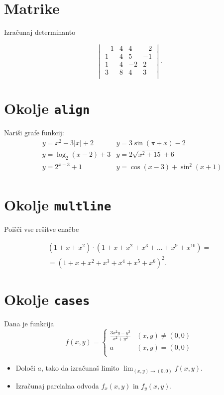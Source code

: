 \documentclass[a4paper,12pt]{article}
\begin{document}
\section*{Matrike}
Izračunaj determinanto 
   
  \[
   \begin{vmatrix}
   
       -1 & 4 & 4 & -2 \\
       1 & 4 & 5 & -1 \\
       1 & 4 & -2 & 2 \\
       3 & 8 & 4 & 3 \\
   \end{vmatrix}
   .\]

\section*{Okolje \texttt{align}}
Nariši grafe funkcij:
\begin{align*}
&y = x^2 - 3|x| + 2   & y = 3 \sin(\pi+x) - 2\\
&y = \log_2(x-2) + 3  & y = 2 \sqrt{x^2+15} + 6\\
&y = 2^{x-3} + 1      & y = \cos(x-3) + \sin^2(x+1)\\
\end{align*}

\section*{Okolje \texttt{multline}}
Poišči vse rešitve enačbe

\begin{multline*}
   (1+x+x^2) \cdot (1+x+x^2+x^3+\ldots+x^9+x^{10}) = \\
   =(1+x+x^2+x^3+x^4+x^5+x^6)^2.
\end{multline*}


\section*{Okolje \texttt{cases}}
Dana je funkcija
\[
f(x,y)= 
\begin{cases}
   \frac{3x^2y-y^3}{x^2+y^2} & (x,y) \neq (0,0) \\
   a & (x,y) = (0,0) \\
\end{cases}
\]
\begin{itemize}
\item Določi \(a\), tako da izračunaš limito \( \lim_{(x,y)\to(0,0)} f(x,y) \).
\item Izračunaj parcialna odvoda \(f_x(x,y)\) in \(f_y(x,y)\).
\end{itemize}
\end{document}
